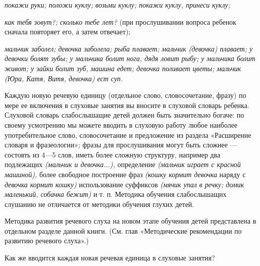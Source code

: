 \documentclass{book}
\renewcommand{\emph}[1]{\textit{#1}}
\begin{document}
\emph{покажи руки; положи куклу; возьми куклу; покажи куклу, принеси
куклу;}

\emph{как тебя зовут?; сколько тебе лет?} (при прослушивании вопроса
ребенок сначала повторяет его, а затем отвечает);

\emph{мальчик заболел; девочка заболела; рыба плавает; мальчик (девочка)
плавает; у девочки болят зубы; у мальчика болит нога, дядя ловит рыбу; у
мальчика болит живот; у зайки болит зуб, машина едет; девочка поливает
цветы; мальчик (Юра, Катя, Витя, девочка) ест суп.}

Каждую новую речевую единицу (отдельное слово, словосочетание, фразу) по
мере ее включения в слуховые занятия вы вносите в слуховой словарь
ребенка. Слуховой словарь слабослышащие детей должен быть значительно
богаче: по своему усмотрению мы можете вводить в слуховую работу любое
наиболее употребительное слово, словосочетание и предложение из раздела
«Расширение словаря и фразеологии»; фразы для прослушивания могут быть
сложнее --- состоять из 4---5 слов, иметь более сложную структуру,
например два подлежащих \emph{(мальчик и девочка...),} определение
\emph{(мальчик играет с красной машиной),} более свободное построение
фраз \emph{(кошку кормит девочка} наряду с \emph{девочка кормит кошку)}
использование суффиксов \emph{(мячик упал в речку; домик маленький,
собачка бежит)} и т. п. Методика обучения слабослышащих слушанию не
отличается от методики обучения глухих детей.

Методика развития речевого слуха на новом этапе обучения детей
представлена в отдельном разделе данной книги. (См. глав «Методические
рекомендации по развитию речевого слуха».)

Как же вводится каждая новая речевая единица в слуховые занятия?
\end{document}
